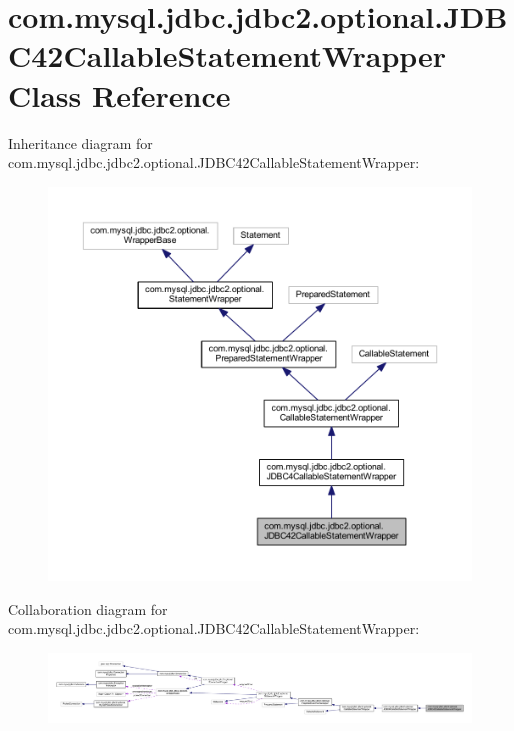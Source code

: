 \hypertarget{classcom_1_1mysql_1_1jdbc_1_1jdbc2_1_1optional_1_1_j_d_b_c42_callable_statement_wrapper}{}\section{com.\+mysql.\+jdbc.\+jdbc2.\+optional.\+J\+D\+B\+C42\+Callable\+Statement\+Wrapper Class Reference}
\label{classcom_1_1mysql_1_1jdbc_1_1jdbc2_1_1optional_1_1_j_d_b_c42_callable_statement_wrapper}


Inheritance diagram for com.\+mysql.\+jdbc.\+jdbc2.\+optional.\+J\+D\+B\+C42\+Callable\+Statement\+Wrapper\+:
\nopagebreak
\begin{figure}[H]
\begin{center}
\leavevmode
\includegraphics[width=350pt]{classcom_1_1mysql_1_1jdbc_1_1jdbc2_1_1optional_1_1_j_d_b_c42_callable_statement_wrapper__inherit__graph}
\end{center}
\end{figure}


Collaboration diagram for com.\+mysql.\+jdbc.\+jdbc2.\+optional.\+J\+D\+B\+C42\+Callable\+Statement\+Wrapper\+:
\nopagebreak
\begin{figure}[H]
\begin{center}
\leavevmode
\includegraphics[width=350pt]{classcom_1_1mysql_1_1jdbc_1_1jdbc2_1_1optional_1_1_j_d_b_c42_callable_statement_wrapper__coll__graph}
\end{center}
\end{figure}
